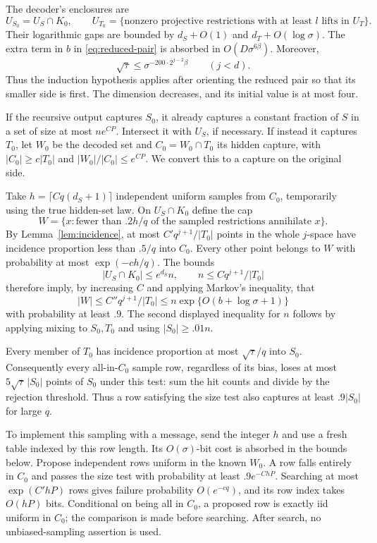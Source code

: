 The decoder's enclosures are
\[
 U_{S_0}=U_S\cap K_0,\qquad
 U_{T_0}=\{\text{nonzero projective restrictions with at least \(l\) lifts in \(U_T\)}\}.
\]
Their logarithmic gaps are bounded by
\(d_S+O(1)\) and \(d_T+O(\log\sigma)\).
The extra term in \(b\) in \eqref{eq:reduced-pair} is absorbed in
\(O(D\sigma^{6\beta})\). Moreover,
\[
 \sqrt\tau\le
 \sigma^{-200\cdot2^{j-2}\beta}\qquad(j<d).
\]
Thus the induction hypothesis applies after orienting the reduced
pair so that its smaller side is first. The dimension decreases,
and its initial value is at most four.

If the recursive output captures \(S_0\), it already captures
a constant fraction of \(S\) in a set of size at most \(ne^{CP}\).
Intersect it with \(U_S\), if necessary.
If instead it captures \(T_0\), let \(W_0\) be the decoded set and
\(C_0=W_0\cap T_0\) its hidden capture, with
\(|C_0|\ge c|T_0|\) and \(|W_0|/|C_0|\le e^{CP}\).
We convert this to a capture on the original side.

Take \(h=\lceil Cq(d_S+1)\rceil\) independent uniform samples
from \(C_0\), temporarily using the true hidden-set law.
On \(U_S\cap K_0\) define the cap
\[
 W=\{x:\text{fewer than } .2h/q
       \text{ of the sampled restrictions annihilate }x\}.
\]
By Lemma~\ref{lem:incidence}, at most \(C'q^{j+1}/|T_0|\)
points in the whole \(j\)-space have incidence proportion
less than \(.5/q\) into \(C_0\).
Every other point belongs to \(W\) with probability at most
\(\exp(-ch/q)\).
The bounds
\[
 |U_S\cap K_0|\le e^{d_S}n,\qquad
 n\le Cq^{j+1}/|T_0|
\]
therefore imply, by increasing \(C\) and applying Markov's
inequality, that
\[
 |W|\le C''q^{j+1}/|T_0|
 \le n\exp\{O(b+\log\sigma+1)\}
\]
with probability at least \(.9\).
The second displayed inequality for \(n\) follows by applying
mixing to \(S_0,T_0\) and using \(|S_0|\ge .01n\).

Every member of \(T_0\) has incidence proportion at most
\(\sqrt\tau/q\) into \(S_0\). Consequently every all-in-\(C_0\)
sample row, regardless of its bias, loses at most
\(5\sqrt\tau\,|S_0|\) points of \(S_0\) under this test:
sum the hit counts and divide by the rejection threshold.
Thus a row satisfying the size test also captures at least
\(.9|S_0|\) for large \(q\).

To implement this sampling with a message, send the integer \(h\)
and use a fresh table indexed by this row length.
Its \(O(\sigma)\)-bit cost is absorbed in the bounds below.
Propose independent rows uniform in the known \(W_0\).
A row falls entirely in \(C_0\)
and passes the size test with probability at least
\(.9e^{-ChP}\). Searching at most \(\exp(C'hP)\) rows gives
failure probability \(O(e^{-cq})\), and its row index takes
\(O(hP)\) bits. Conditional on being all in \(C_0\), a proposed
row is exactly iid uniform in \(C_0\); the comparison is made
before searching. After search, no unbiased-sampling assertion
is used.

